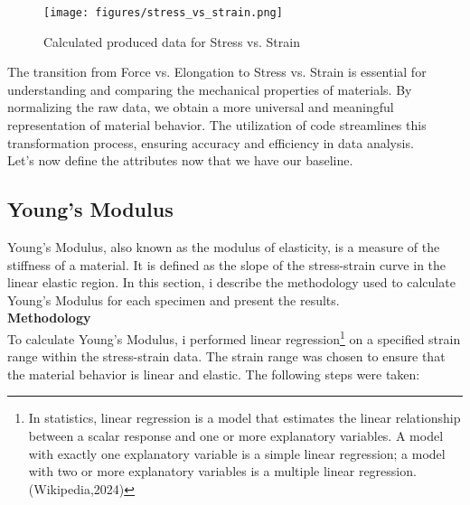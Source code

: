 \documentclass{article}
\begin{document}
{ \begin{figure}[H]
     \centering
     \texttt{[image: figures/stress\_vs\_strain.png]}
     \caption{Calculated produced data for Stress vs. Strain}
     \label{fig:stress_strain}
 \end{figure} 
 The transition from Force vs. Elongation to Stress vs. Strain is essential for understanding and comparing the mechanical properties of materials. By normalizing the raw data, we obtain a more universal and meaningful representation of material behavior. The utilization of code streamlines this transformation process, ensuring accuracy and efficiency in data analysis.\\[8pt] 
 Let's now define the attributes now that we have our baseline.
   \newpage
\subsection{Young's Modulus}

Young's Modulus, also known as the modulus of elasticity, is a measure of the stiffness of a material. It is defined as the slope of the stress-strain curve in the linear elastic region. In this section, i describe the methodology used to calculate Young's Modulus for each specimen and present the results.\\[8pt]

\textbf{Methodology}\\[8pt]

To calculate Young's Modulus, i performed linear regression\footnote{In statistics, linear regression is a model that estimates the linear relationship between a scalar response and one or more explanatory variables. A model with exactly one explanatory variable is a simple linear regression; a model with two or more explanatory variables is a multiple linear regression. (Wikipedia,2024)} on a specified strain range within the stress-strain data. The strain range was chosen to ensure that the material behavior is linear and elastic. The following steps were taken:

}
\end{document}
